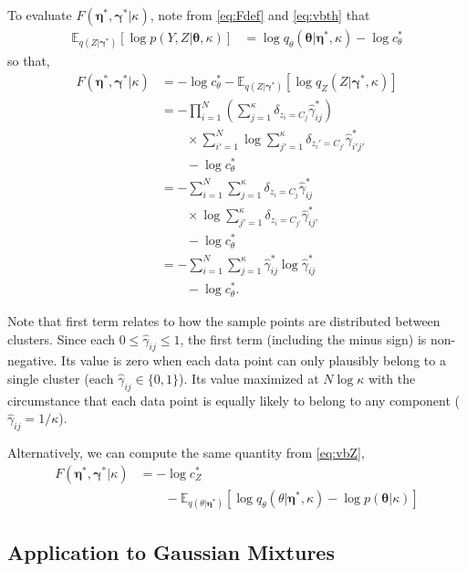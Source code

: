 \documentclass[aps,showpacs,twocolumn,prd,superscriptaddress,nofootinbib]{revtex4}
\newcommand{\nn}{\nonumber}
\newcommand{\E}[1]{{\mathbb E}_{#1}\!}
\begin{document}
To evaluate $F(\bm\eta^*,\bm\gamma^*|\kappa)$, note from \eqref{eq:Fdef} and \eqref{eq:vbth} that
\begin{align}
  \E{q(Z|\bm\gamma^*)}\left[\log p(Y,Z|\bm\theta,\kappa)\right]&=\log q_\theta(\bm\theta|\bm\eta^*,\kappa)-\log c_\theta^*
\end{align}
so that,
\begin{align}
  F(\bm\eta^*,\bm\gamma^*|\kappa)&=-\log c_\theta^* -\E{q(Z|\bm\gamma^*)}\left[\log q_Z(Z|\bm\gamma^*,\kappa)\right]\nn\\
  &=-\prod_{i=1}^N\left(\sum_{j=1}^\kappa\delta_{z_i{=}C_j}\hat\gamma^*_{ij}\right)
  \nn\\
  &\qquad\times
  \sum_{i'=1}^N\log\sum_{j'=1}^\kappa\delta_{z_i'{=}C_{j'}}\hat\gamma^*_{i'j'}
  \nn\\
  &\qquad-\log c_\theta^*\nn\\
  &=-\sum_{i=1}^N\sum_{j=1}^\kappa\delta_{z_i{=}C_j}\hat\gamma^*_{ij}
  \nn\\
  &\qquad\times
    \log\sum_{j'=1}^\kappa\delta_{z_i{=}C_{j'}}\hat\gamma^*_{ij'}
  \nn\\
  &\qquad-\log c_\theta^*
  \nn\\
  &=-\sum_{i=1}^N\sum_{j=1}^\kappa\hat\gamma^*_{ij}\log\hat\gamma^*_{ij}
  \nn\\
  &\qquad-\log c_\theta^*
  \label{eq:Feval-th}
  .
\end{align}

Note that first term relates to how the sample points are distributed between clusters.  Since each $0\leq\hat\gamma_{ij}\leq 1$, the first term (including the minus sign) is non-negative.  Its value is zero when each data point can only plausibly belong to a single cluster (each $\hat\gamma_{ij}\in\{0,1\}$).  Its value maximized at  $N\log\kappa$ with the circumstance that each data point is equally likely to belong to any component ($\hat\gamma_{ij}=1/\kappa$).

Alternatively, we can compute the same quantity from \eqref{eq:vbZ},
\begin{align}
  F(\bm\eta^*,\bm\gamma^*|\kappa)&=-\log c_Z^*\nn\\
  &\qquad-\E{q(\theta|\bm\eta^*)}\left[\log q_\theta(\theta|\bm\eta^*,\kappa)-\log p(\bm\theta|\kappa)\right]\label{eq:Feval-Z}
\end{align}

\subsection{Application to Gaussian Mixtures}
\end{document}
